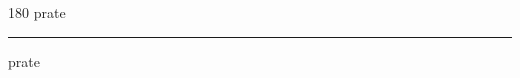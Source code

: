 
\begin{frame}
\begin{center}
\begin{turn}{180}
{\fontsize{2.5cm}{1em}\selectfont prate}
\end{turn}
\vspace{1em}\par  
\hrule
\vspace{1em}\par  
{\fontsize{2.5cm}{1em}\selectfont prate}
\end{center}
\end{frame}
